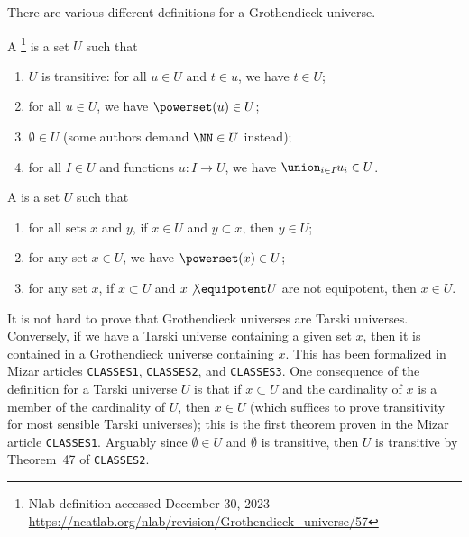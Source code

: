 \begin{node}\label{tg-0001}%
There are various different definitions for a Grothendieck universe.
\begin{definition}\label{set:tg-0000}%
A \footnote{Nlab definition accessed
December 30, 2023 \url{https://ncatlab.org/nlab/revision/Grothendieck+universe/57}} is a set $U$ such that
\begin{enumerate}
\item $U$ is transitive: for all $u\in U$ and $t\in u$, we have $t\in U$;
\item for all $u\in U$, we have $\powerset(u)\in U$;
\item $\emptyset\in U$ (some authors demand $\NN\in U$ instead);
\item for all $I\in U$ and functions $u\colon I\to U$, we have
  $\union_{i\in I}u_{i}\in U$.
\end{enumerate}
\end{definition}

\begin{definition}\label{tg-000B}%
A  is a set $U$ such that
\begin{enumerate}
\item for all sets $x$ and $y$, if $x\in U$ and $y\subset x$, then $y\in U$;
\item for any set $x\in U$, we have $\powerset(x)\in U$;
\item for any set $x$, if $x\subset U$ and $x\not\equipotent U$ are not equipotent, then $x\in U$.
\end{enumerate}
\begin{node}[Remarks]\label{tg-0002}%
It is not hard to prove that Grothendieck universes are Tarski
universes.  Conversely, if we have a Tarski universe containing a given
set $x$, then it is contained in a Grothendieck universe containing
$x$. This has been formalized in Mizar articles \texttt{CLASSES1},
\texttt{CLASSES2}, and \texttt{CLASSES3}. One consequence of the
definition for a Tarski universe $U$ is that if $x\subset U$ and the
cardinality of $x$ is a member of the cardinality of $U$, then $x\in U$
(which suffices to prove transitivity for most sensible Tarski
universes); this is the first theorem proven in the Mizar article
\texttt{CLASSES1}. Arguably since $\emptyset\in U$ and $\emptyset$ is
transitive, then $U$ is transitive by Theorem~47 of \texttt{CLASSES2}.


\end{node}
\end{definition}
\end{node}
